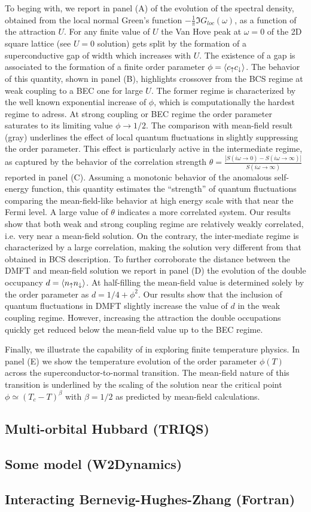 \documentclass[edipack2.tex]{subfiles}
\begin{document}
To beging with, we report in  panel (A) of  the
evolution of the spectral density, obtained from the local normal
Green's function $-\tfrac{1}{\pi}\Im{G}_{loc}(\omega)$, as a function
of the attraction $U$. For any finite value of  $U$ the Van Hove peak
at $\omega=0$ of the 2D square lattice (see $U=0$
solution) gets split by the formation of a superconductive gap of
width which increases with $U$.
The existence of a gap is associated to the formation of a finite
order parameter $\phi=\langle c_\uparrow c_\downarrow\rangle$. The behavior of
this quantity, shown in panel (B), highlights crossover from the BCS
regime at weak coupling to a BEC one for large $U$.
The former regime is characterized by the well known exponential increase of
$\phi$, which is computationally the hardest regime to adress. At
strong coupling or BEC regime the order parameter saturates to its
limiting value $\phi\to 1/2$. The comparison with mean-field result
(gray) underlines the effect of local quantum fluctuations in slightly
suppressing the order parameter. This effect is particularly active in
the intermediate regime, as captured by the behavior of the
correlation strength
$\theta=\frac{|S(i\omega\to 0)-S(i\omega\to\infty)|}{S(i\omega\to\infty)}$
reported in panel (C). Assuming a monotonic behavior of the anomalous
self-energy function, this quantity estimates the ``strength'' of
quantum fluctuations comparing the mean-field-like behavior at high
energy scale with that near the Fermi level. A large value of $\theta$
indicates a more correlated system.
Our results show that both weak and strong coupling regime are
relatively weakly correlated, i.e. very near a mean-field solution. On
the contrary, the inter-mediate regime is characterized by a large
correlation, making the solution very different from that obtained in
BCS description.  
To further corroborate the distance between the DMFT and mean-field
solution we report in panel (D) the evolution of the double occupancy
$d=\langle n_\uparrow n_\downarrow\rangle$. At half-filling the mean-field value is
determined solely by the order parameter as $d=1/4 + \phi^2$.
Our results show that the inclusion of quantum fluctuations in DMFT
slightly increase the value of $d$ in the weak coupling
regime. However, increasing the attraction the double occupations
quickly get reduced below the mean-field value up to the BEC regime.

Finally, we illustrate the capability of \NAME in
exploring finite temperature physics. In panel (E) we show the
temperature evolution of the order parameter $\phi(T)$ across the
superconductor-to-normal transition. The mean-field nature of this
transition is underlined by the scaling of  the solution near
the critical point $\phi \simeq (T_c-T)^\beta$ with $\beta=1/2$ as
predicted by mean-field calculations. 





\subsection{Multi-orbital Hubbard (TRIQS)}

\subsection{Some model (W2Dynamics)}

\subsection{Interacting Bernevig-Hughes-Zhang (Fortran)}
\end{document}
